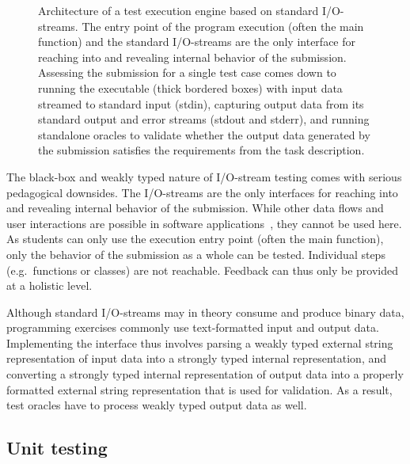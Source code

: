 \documentclass[../main]{subfiles}
\begin{document}
\begin{figure}
    \centering
    
    \caption{Architecture of a test execution engine based on standard I/O-streams. The entry point of the program execution (often the main function) and the standard I/O-streams are the only interface for reaching into and revealing internal behavior of the submission. Assessing the submission for a single test case comes down to running the executable (thick bordered boxes) with \textcolor{ugent-ps}{input data} streamed to standard input (stdin), capturing \textcolor{ugent-we}{output data} from its standard output and error streams (stdout and stderr), and running standalone oracles to validate whether the output data generated by the submission satisfies the requirements from the task description.\label{fig:io-testing}}
\end{figure}

The black-box and weakly typed nature of I/O-stream testing comes with serious pedagogical downsides.
The I/O-streams are the only interfaces for reaching into and revealing internal behavior of the submission.
While other data flows and user interactions are possible in software applications~\autocite{khorramTestingFrameworkExecutable2022}, they cannot be used here.
As students can only use the execution entry point (often the main function), only the behavior of the submission as a whole can be tested.
Individual steps (e.g.\ functions or classes) are not reachable.
Feedback can thus only be provided at a holistic level.

Although standard I/O-streams may in theory consume and produce binary data, programming exercises commonly use text-formatted input and output data.
Implementing the interface thus involves parsing a weakly typed external string representation of input data into a strongly typed internal representation, and converting a strongly typed internal representation of output data into a properly formatted external string representation that is used for validation.
As a result, test oracles have to process weakly typed output data as well.

\subsection{Unit testing}\label{subsec:dsl-unit-testing}
\end{document}
